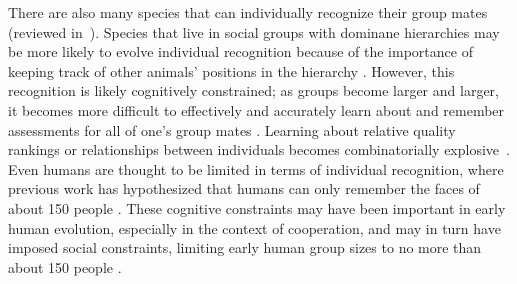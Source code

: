 There are also many species that can individually recognize their group mates (reviewed in~\cite{Tibbetts2007IndividualDifferent,Wiley2013SpecificityBehaviour}). Species that live in social groups with dominane hierarchies may be more likely to evolve individual recognition because of the importance of keeping track of other animals' positions in the hierarchy \cite{Barnard:1979fk}. However, this recognition is likely cognitively constrained; as groups become larger and larger, it becomes more difficult to effectively and accurately learn about and remember assessments for all of one's group mates \cite{Rohwer:1982fk,Solberg:1997uq}. Learning about relative quality rankings or relationships between individuals becomes combinatorially explosive~\cite{Seyfarth2015SocialCognition}. Even humans are thought to be limited in terms of individual recognition, where previous work has hypothesized that humans can only remember the faces of about 150 people \cite{Dunbar:1993zr,Hill:2003ly}. These cognitive constraints may have been important in early human evolution, especially in the context of cooperation, and may in turn have imposed social constraints, limiting early human group sizes to no more than about 150 people \cite{Dunbar:1993zr,Dunbar:1992ys}.


